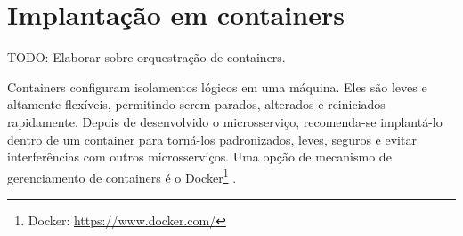 


\section{Implantação em containers}
TODO: Elaborar sobre orquestração de containers.

Containers configuram isolamentos lógicos em uma máquina. Eles são leves e altamente flexíveis, permitindo serem parados, alterados e reiniciados rapidamente. Depois de desenvolvido o microsserviço, recomenda-se implantá-lo dentro de um container para torná-los padronizados, leves, seguros e evitar interferências com outros microsserviços. Uma opção de mecanismo de gerenciamento de containers é o Docker\footnote{Docker: \url{https://www.docker.com/}} \cite{oracle_microservices}.



